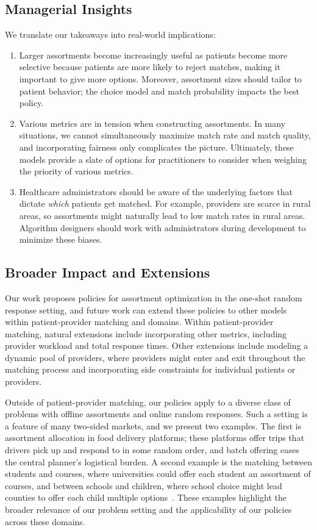 \documentclass[11pt]{article}
\begin{document}
\subsection{Managerial Insights}
We translate our takeaways into real-world implications: 
\begin{enumerate}
    \item  Larger assortments become increasingly useful as patients become more selective because patients are more likely to reject matches, making it important to give more options. 
    Moreover, assortment sizes should tailor to patient behavior; the choice model and match probability impacts the best policy. 
    \item Various metrics are in tension when constructing assortments. In many situations, we cannot simultaneously maximize match rate and match quality, and incorporating fairness only complicates the picture. 
    Ultimately, these models provide a slate of options for practitioners to consider when weighing the priority of various metrics. 
    \item Healthcare administrators should be aware of the underlying factors that dictate \textit{which} patients get matched. For example, providers are scarce in rural areas, so assortments might naturally lead to low match rates in rural areas. Algorithm designers should work with administrators during development to minimize these biases.   
\end{enumerate}

\subsection{Broader Impact and Extensions}
Our work proposes policies for assortment optimization in the one-shot random response setting, and future work can extend these policies to other models within patient-provider matching and domains. 
Within patient-provider matching, natural extensions include incorporating  other metrics, including provider workload and total response times. 
Other extensions include modeling a dynamic pool of providers, where providers might enter and exit throughout the matching process and incorporating side constraints for individual patients or providers. 

Outside of patient-provider matching, our policies apply to a diverse class of problems with offline assortments and online random responses. 
Such a setting is a feature of many two-sided markets, and we present two examples. 
The first is assortment allocation in food delivery platforms; these platforms offer trips that drivers pick up and respond to in some random order, and batch offering eases the central planner's logistical burden. 
A second example is the matching between students and courses, where universities could offer each student an assortment of courses, and between schools and children, where school choice might lead counties to offer each child multiple options~\citep{school_choice}. 
These examples highlight the broader relevance of our problem setting and the applicability of our policies across these domains. 
 
\end{document}
